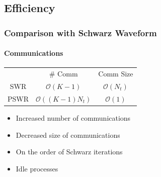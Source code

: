 \documentclass[]{beamer}
\begin{document}






\subsection{Efficiency}


\begin{frame}
  \frametitle{Comparison with Schwarz Waveform}
  \framesubtitle{Communications}

  \begin{tabular}{c c c}
     & \# Comm & Comm Size \\
     SWR & $\mathcal{O}(K-1)$       & $\mathcal{O}(N_t)$ \\
     PSWR & $\mathcal{O}((K-1) N_t)$  & $\mathcal{O}(1)$  
  \end{tabular}

  \begin{itemize}[<+->]
  \item Increased number of communications
  \item Decreased size of communications
  \item On the order of Schwarz iterations
  \item Idle processes
  \end{itemize}

\end{frame}
\end{document}
